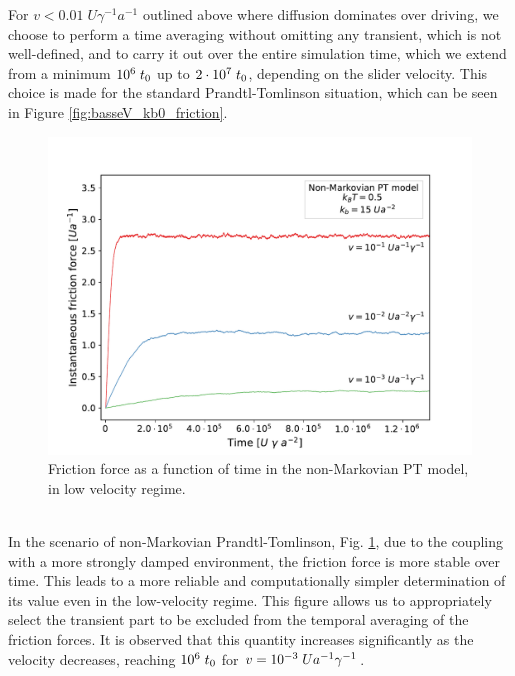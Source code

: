 For $v<0.01\; U\gamma^{-1}a^{-1}$ outlined above where diffusion dominates over driving, we choose to perform a time averaging without omitting any transient, which is not well-defined, and to carry it out over the entire simulation time, which we extend from a minimum $10^6 \hspace{0.1cm}t_0$ up to $2 \cdot 10^7 \hspace{0.1cm}t_0$, depending on the slider velocity. This choice is made for the standard Prandtl-Tomlinson situation, which can be seen in Figure \ref{fig:basseV_kb0_friction}.
\begin{figure}
    \centering
    \includegraphics[width=\textwidth]{basseV_kb15_forzaplot.pdf}
    \caption{Friction force as a function of time in the non-Markovian PT model, in low velocity regime.}
    \label{fig:basseV_kb15_friction}
\end{figure}
\\
In the scenario of non-Markovian Prandtl-Tomlinson, Fig. \ref{fig:basseV_kb15_friction}, due to the coupling with a more strongly damped environment, the friction force is more stable over time. This leads to a more reliable and computationally simpler determination of its value even in the low-velocity regime. This figure allows us to appropriately select the transient part to be excluded from the temporal averaging of the friction forces. It is observed that this quantity increases significantly as the velocity decreases, reaching $10^6\hspace{0.1cm}  t_0$ for $v=10^{-3} \hspace{0.1cm} Ua^{-1}\gamma^{-1}$.

